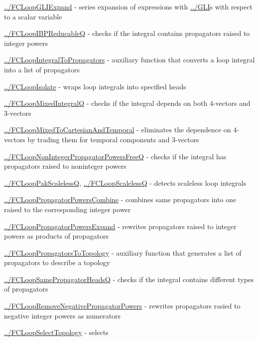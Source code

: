\documentclass[../FeynCalcManual.tex]{subfiles}
\begin{document}
\begin{itemize}
{  \hyperlink{../fcloopgliexpand}{../FCLoopGLIExpand} - series expansion
  of expressions with \hyperlink{../gli}{../GLI}s with respect to a
  scalar variable
\item
  \hyperlink{../fcloopibpreducableq}{../FCLoopIBPReducableQ} - checks if
  the integral contains propagators raised to integer powers
\item
  \hyperlink{../fcloopintegraltopropagators}{../FCLoopIntegralToPropagators}
  - auxiliary function that converts a loop integral into a list of
  propagators
\item
  \hyperlink{../fcloopisolate}{../FCLoopIsolate} - wraps loop integrals
  into specified heads
\item
  \hyperlink{../fcloopmixedintegralq}{../FCLoopMixedIntegralQ} - checks
  if the integral depends on both \(4\)-vectors and \(3\)-vectors
\item
  \hyperlink{../fcloopmixedtocartesianandtemporal}{../FCLoopMixedToCartesianAndTemporal}
  - eliminates the dependence on \(4\)-vectors by trading them for
  temporal components and \(3\)-vectors
\item
  \hyperlink{../fcloopnonintegerpropagatorpowersfreeq}{../FCLoopNonIntegerPropagatorPowersFreeQ}
  - checks if the integral has propagators raised to noninteger powers
\item
  \hyperlink{../fclooppakscalelessq}{../FCLoopPakScalelessQ},
  \hyperlink{../fcloopscalelessq}{../FCLoopScalelessQ} - detects
  scaleless loop integrals
\item
  \hyperlink{../fclooppropagatorpowerscombine}{../FCLoopPropagatorPowersCombine}
  - combines same propagators into one raised to the corresponding
  integer power
\item
  \hyperlink{../fclooppropagatorpowersexpand}{../FCLoopPropagatorPowersExpand}
  - rewrites propagators raised to integer powers as products of
  propagators
\item
  \hyperlink{../fclooppropagatorstotopology}{../FCLoopPropagatorsToTopology}
  - auxiliary function that generates a list of propagators to describe
  a topology
\item
  \hyperlink{../fcloopsamepropagatorheadsq}{../FCLoopSamePropagatorHeadsQ}
  - checks if the integral contains different types of propagators
\item
  \hyperlink{../fcloopremovenegativepropagatorpowers}{../FCLoopRemoveNegativePropagatorPowers}
  - rewrites propagators rasied to negative integer powers as numerators
\item
  \hyperlink{../fcloopselecttopology}{../FCLoopSelectTopology} - selects
}
\end{itemize}
\end{document}
